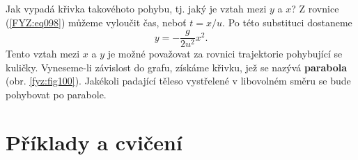     Jak vypadá křivka takovéhoto pohybu, tj. jaký je vztah mezi \(y\) a \(x\)? Z rovnice 
    (\ref{FYZ:eq098}) můžeme vyloučit čas, neboť \(t= x/u\). Po této substituci dostaneme
    \begin{equation}\label{FYZ:eq099}
      y = -\frac{g}{2u^2}x^2.
    \end{equation}
    Tento vztah mezi \(x\) a \(y\) je možné považovat za rovnici trajektorie pohybující se kuličky. 
    Vyneseme-li závislost do grafu, získáme křivku, jež se nazývá \textbf{parabola} (obr. 
    \ref{fyz:fig100}). Jakékoli padající těleso vystřelené v libovolném směru se bude pohybovat po 
    parabole. 
  
  \newpage
  \section{Příklady a cvičení}
      

\printbibliography[heading=subbibliography]
